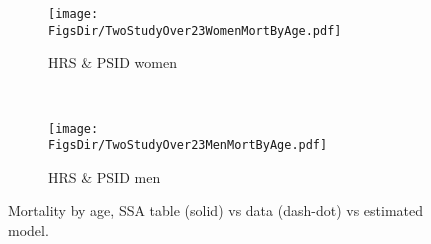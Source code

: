 \documentclass[12pt,pdftex,letterpaper]{article}
\newcommand{\RootDir}{..}
\newcommand{\FigsDir}{\RootDir/Figures}
\begin{document}
\begin{figure}
	\centering
	\begin{subfigure}[b]{0.48\textwidth}
		\texttt{[image: \\FigsDir/TwoStudyOver23WomenMortByAge.pdf]}
		\caption{HRS \& PSID women}\label{fig:MEPSwomenMortAge}
	\end{subfigure}
	~
	\centering
	\begin{subfigure}[b]{0.48\textwidth}
		\texttt{[image: \\FigsDir/TwoStudyOver23MenMortByAge.pdf]}
		\caption{HRS \& PSID men}\label{fig:TwoStudyMenMortAge}
	\end{subfigure}
	\caption{Mortality by age, SSA table (solid) vs data (dash-dot) vs estimated model.} \label{fig:MortFitByAge}
\end{figure}
\end{document}
